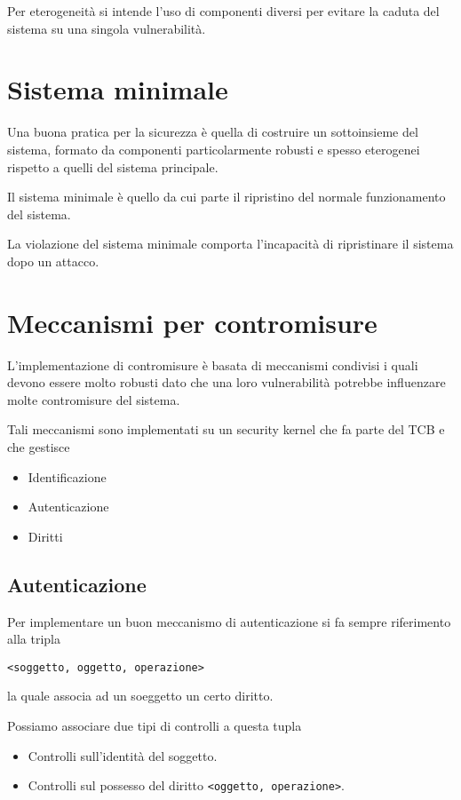 Per eterogeneità si intende l'uso di componenti diversi per evitare la caduta del sistema su una singola vulnerabilità.

\section{Sistema minimale}
Una buona pratica per la sicurezza è quella di costruire un sottoinsieme del sistema, formato da componenti
particolarmente robusti e spesso eterogenei rispetto a quelli del sistema principale.

Il sistema minimale è quello da cui parte il ripristino del normale funzionamento del sistema.

La violazione del sistema minimale comporta l'incapacità di ripristinare il sistema dopo un attacco.

\section{Meccanismi per contromisure}
L'implementazione di contromisure è basata di meccanismi condivisi i quali devono essere molto robusti dato che una
loro vulnerabilità potrebbe influenzare molte contromisure del sistema.

Tali meccanismi sono implementati su un security kernel che fa parte del TCB e che gestisce
\begin{itemize}
	\item Identificazione
	\item Autenticazione
	\item Diritti
\end{itemize}

\subsection{Autenticazione}
Per implementare un buon meccanismo di autenticazione si fa sempre riferimento alla tripla
\begin{center}
	\verb|<soggetto, oggetto, operazione>|
\end{center}
la quale associa ad un soeggetto un certo diritto.

Possiamo associare due tipi di controlli a questa tupla
\begin{itemize}
	\item Controlli sull'identità del soggetto.
	\item Controlli sul possesso del diritto \verb|<oggetto, operazione>|.
\end{itemize}

